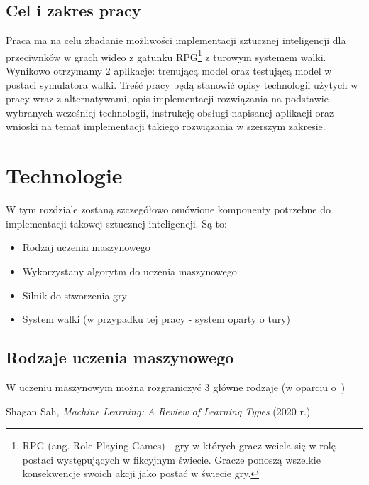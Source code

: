 \documentclass{SGGW-thesis}
\begin{document}
\section{Cel i zakres pracy}
Praca ma na celu zbadanie możliwości implementacji sztucznej inteligencji dla przeciwnków w grach wideo z gatunku RPG\footnote{RPG (ang. Role Playing Games) 
- gry w których gracz wciela się w rolę postaci występujących w fikcyjnym świecie. Gracze ponoszą wszelkie konsekwencje swoich akcji jako postać w świecie gry.}
z turowym systemem walki. Wynikowo otrzymamy 2 aplikacje: trenującą model oraz testującą model w postaci symulatora walki. Treść pracy będą stanowić opisy technologii
użytych w pracy wraz z alternatywami, opis implementacji rozwiązania na podstawie wybranych wcześniej technologii, instrukcję obsługi napisanej aplikacji oraz
wnioski na temat implementacji takiego rozwiązania w szerszym zakresie.


\chapter{Technologie}
W tym rozdziale zostaną szczegółowo omówione komponenty potrzebne do implementacji takowej sztucznej inteligencji. Są to: 
\begin{itemize}
  \item{Rodzaj uczenia maszynowego}
  \item{Wykorzystany algorytm do uczenia maszynowego}
  \item{Silnik do stworzenia gry}
  \item{System walki (w przypadku tej pracy - system oparty o tury)}
\end{itemize}


\section{Rodzaje uczenia maszynowego}
W uczeniu maszynowym można rozgraniczyć 3 główne rodzaje (w oparciu o~\cite{MachineLearningTypes})



\begin{thebibliography}{9}
  Shagan Sah,
  \textit{Machine Learning: A Review of Learning Types}
  (2020 r.)
\end{thebibliography}

\beforelastpage
\end{document}
